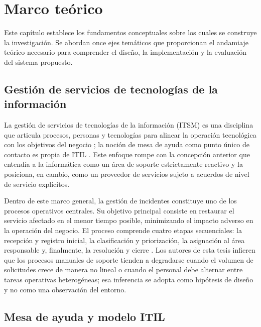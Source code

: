 \section{Marco teórico}\label{sec:marco-teorico}

Este capítulo establece los fundamentos conceptuales sobre los cuales se construye la investigación. Se abordan once ejes temáticos que proporcionan el andamiaje teórico necesario para comprender el diseño, la implementación y la evaluación del sistema propuesto.

\subsection{Gestión de servicios de tecnologías de la información}\label{subsec:gestion-servicios-ti}

La gestión de servicios de tecnologías de la información (ITSM) es una disciplina que articula procesos, personas y tecnologías para alinear la operación tecnológica con los objetivos del negocio \parencite{Galup2009_itsm}; la noción de mesa de ayuda como punto único de contacto es propia de ITIL \parencite{OGC2011_itil}. Este enfoque rompe con la concepción anterior que entendía a la informática como un área de soporte estrictamente reactivo y la posiciona, en cambio, como un proveedor de servicios sujeto a acuerdos de nivel de servicio explícitos.

Dentro de este marco general, la gestión de incidentes constituye uno de los procesos operativos centrales. Su objetivo principal consiste en restaurar el servicio afectado en el menor tiempo posible, minimizando el impacto adverso en la operación del negocio. El proceso comprende cuatro etapas secuenciales: la recepción y registro inicial, la clasificación y priorización, la asignación al área responsable y, finalmente, la resolución y cierre \parencite{OGC2011_itil}. Los autores de esta tesis infieren que los procesos manuales de soporte tienden a degradarse cuando el volumen de solicitudes crece de manera no lineal o cuando el personal debe alternar entre tareas operativas heterogéneas; esa inferencia se adopta como hipótesis de diseño y no como una observación del entorno.

\subsection{Mesa de ayuda y modelo ITIL}\label{subsec:mesa-ayuda-itil}

